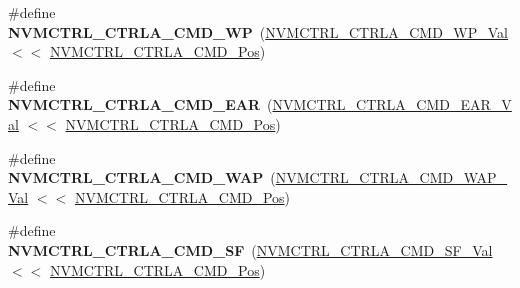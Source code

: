 \begin{DoxyCompactItemize}
\item 
\hypertarget{group___s_a_m_l21___n_v_m_c_t_r_l_gad21e753f2741af430e0a52f2a9a15eab}{}\#define {\bfseries N\+V\+M\+C\+T\+R\+L\+\_\+\+C\+T\+R\+L\+A\+\_\+\+C\+M\+D\+\_\+\+W\+P}~(\hyperlink{group___s_a_m_l21___n_v_m_c_t_r_l_gad7cfc5fc0cd04b2bbe3337a035b6d127}{N\+V\+M\+C\+T\+R\+L\+\_\+\+C\+T\+R\+L\+A\+\_\+\+C\+M\+D\+\_\+\+W\+P\+\_\+\+Val}      $<$$<$ \hyperlink{group___s_a_m_l21___n_v_m_c_t_r_l_ga5346c6f8ba695f7cadb7f07bde6e25f8}{N\+V\+M\+C\+T\+R\+L\+\_\+\+C\+T\+R\+L\+A\+\_\+\+C\+M\+D\+\_\+\+Pos})\label{group___s_a_m_l21___n_v_m_c_t_r_l_gad21e753f2741af430e0a52f2a9a15eab}

\item 
\hypertarget{group___s_a_m_l21___n_v_m_c_t_r_l_gac046ff781ead0748e07c007c15e41ad7}{}\#define {\bfseries N\+V\+M\+C\+T\+R\+L\+\_\+\+C\+T\+R\+L\+A\+\_\+\+C\+M\+D\+\_\+\+E\+A\+R}~(\hyperlink{group___s_a_m_l21___n_v_m_c_t_r_l_ga07c4451d3f3e0d0dbed551ef0c3bbd21}{N\+V\+M\+C\+T\+R\+L\+\_\+\+C\+T\+R\+L\+A\+\_\+\+C\+M\+D\+\_\+\+E\+A\+R\+\_\+\+Val}     $<$$<$ \hyperlink{group___s_a_m_l21___n_v_m_c_t_r_l_ga5346c6f8ba695f7cadb7f07bde6e25f8}{N\+V\+M\+C\+T\+R\+L\+\_\+\+C\+T\+R\+L\+A\+\_\+\+C\+M\+D\+\_\+\+Pos})\label{group___s_a_m_l21___n_v_m_c_t_r_l_gac046ff781ead0748e07c007c15e41ad7}

\item 
\hypertarget{group___s_a_m_l21___n_v_m_c_t_r_l_ga2ce3d94a5f09832706179f27bbe94d71}{}\#define {\bfseries N\+V\+M\+C\+T\+R\+L\+\_\+\+C\+T\+R\+L\+A\+\_\+\+C\+M\+D\+\_\+\+W\+A\+P}~(\hyperlink{group___s_a_m_l21___n_v_m_c_t_r_l_ga16088beab7d82fdbb34bac9971d21859}{N\+V\+M\+C\+T\+R\+L\+\_\+\+C\+T\+R\+L\+A\+\_\+\+C\+M\+D\+\_\+\+W\+A\+P\+\_\+\+Val}     $<$$<$ \hyperlink{group___s_a_m_l21___n_v_m_c_t_r_l_ga5346c6f8ba695f7cadb7f07bde6e25f8}{N\+V\+M\+C\+T\+R\+L\+\_\+\+C\+T\+R\+L\+A\+\_\+\+C\+M\+D\+\_\+\+Pos})\label{group___s_a_m_l21___n_v_m_c_t_r_l_ga2ce3d94a5f09832706179f27bbe94d71}

\item 
\hypertarget{group___s_a_m_l21___n_v_m_c_t_r_l_ga98dcae15125d4efee881b3964b7d23a1}{}\#define {\bfseries N\+V\+M\+C\+T\+R\+L\+\_\+\+C\+T\+R\+L\+A\+\_\+\+C\+M\+D\+\_\+\+S\+F}~(\hyperlink{group___s_a_m_l21___n_v_m_c_t_r_l_ga37bc89b225c1b5d5a07bc707ef910ecb}{N\+V\+M\+C\+T\+R\+L\+\_\+\+C\+T\+R\+L\+A\+\_\+\+C\+M\+D\+\_\+\+S\+F\+\_\+\+Val}      $<$$<$ \hyperlink{group___s_a_m_l21___n_v_m_c_t_r_l_ga5346c6f8ba695f7cadb7f07bde6e25f8}{N\+V\+M\+C\+T\+R\+L\+\_\+\+C\+T\+R\+L\+A\+\_\+\+C\+M\+D\+\_\+\+Pos})\label{group___s_a_m_l21___n_v_m_c_t_r_l_ga98dcae15125d4efee881b3964b7d23a1}


\end{DoxyCompactItemize}
